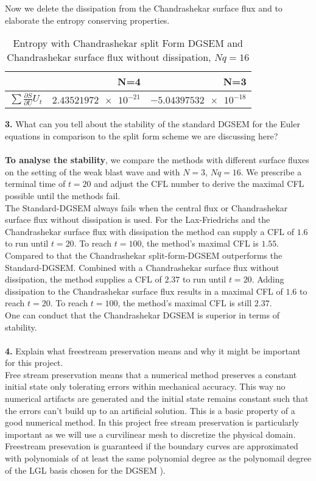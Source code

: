 \documentclass[11pt]{scrartcl}
\begin{document}
Now we delete the dissipation from the Chandrashekar surface flux and to elaborate the entropy conserving properties.
\begin{table}[H]
\centering
\begin{tabular}{|r|r|r|}
    \hline\hline
     & \textbf{N=4} & \textbf{N=3} \\\hline
    $\sum \frac{\partial S}{\partial U} U_t$ & $\num{2.43521972e-21}$ & $\num{-5.04397532e-18}$ \\\hline\hline
\end{tabular}
\caption{Entropy with Chandrashekar split Form DGSEM and Chandrashekar surface flux without dissipation, $Nq = 16$}
\end{table}

\textbf{3.} What can you tell about the stability of the standard DGSEM for the Euler equations in comparison to the split form scheme we are discussing here? \\ \ \\
\textbf{To analyse the stability}, we compare the methods with different surface fluxes on the setting of the weak blast wave and with $N=3$, $Nq = 16$. We prescribe a terminal time of $t=20$ and adjust the CFL number to derive the maximal CFL possible until the methods fail. \\
The Standard-DGSEM always fails when the central flux or Chandrashekar surface flux without dissipation is used. For the Lax-Friedrichs and the Chandrashekar surface flux with dissipation the method can supply a CFL of $1.6$ to run until $t=20$. To reach $t=100$, the method's maximal CFL is $1.55$. \\
Compared to that the Chandrashekar split-form-DGSEM outperforms the Standard-DGSEM. Combined with a Chandrashekar surface flux without dissipation, the method supplies a CFL of $2.37$ to run until $t=20$. Adding dissipation to the Chandrashekar surface flux results in a maximal CFL of $1.6$ to reach $t=20$. To reach $t=100$, the method's maximal CFL is still $2.37$. \\
One can conduct that the Chandrashekar DGSEM is superior in terms of stability.
\\ \ \\

\textbf{4.} Explain what freestream preservation means and why it might be important for this project. \\

Free stream preservation means that a numerical method preserves a constant initial state only tolerating errors within mechanical accuracy. This way no numerical artifacts are generated and the initial state remains constant such that the errors can't build up to an artificial solution. This is a basic property of a good numerical method. In this project free stream preservation is particularly important as we will use a curvilinear mesh to discretize the physical domain. Freestream presevation is guaranteed if the boundary curves are approximated with polynomials of at least the same polynomial degree as the polynomail degree of the LGL basis chosen for the DGSEM \cite{Gassner_WR1}).
\end{document}
